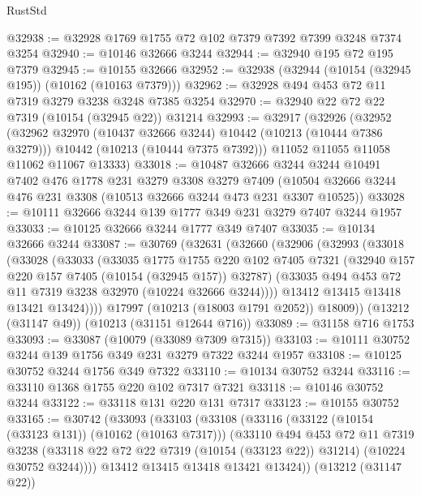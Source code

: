 \begin{lexlean}{RustStd}
\begin{coremodule}
{\begin{coremodule}
{{{{{{{{{{{{{{{{{{{{{{{{{{@32938 := @32928 @1769 @1755 @72 @102 @7379 @7392 @7399 @3248 @7374 @3254
@32940 := @10146 @32666 @3244
@32944 := @32940 @195 @72 @195 @7379
@32945 := @10155 @32666
@32952 := @32938 (@32944 (@10154 (@32945 @195)) (@10162 (@10163 @7379)))
@32962 := @32928 @494 @453 @72 @11 @7319 @3279 @3238 @3248 @7385 @3254
@32970 := @32940 @22 @72 @22 @7319 (@10154 (@32945 @22)) @31214
@32993 := @32917
    (@32926
      (@32952
        (@32962 @32970 (@10437 @32666 @3244) @10442 (@10213 (@10444 @7386 @3279)))
        @10442
        (@10213 (@10444 @7375 @7392)))
      @11052
      @11055
      @11058
      @11062
      @11067
      @13333)
@33018 := @10487
    @32666
    @3244
    @3244
    @10491
    @7402
    @476
    @1778
    @231
    @3279
    @3308
    @3279
    @7409
    (@10504 @32666 @3244 @476 @231 @3308 (@10513 @32666 @3244 @473 @231 @3307 @10525))
@33028 := @10111 @32666 @3244 @139 @1777 @349 @231 @3279 @7407 @3244 @1957
@33033 := @10125 @32666 @3244 @1777 @349 @7407
@33035 := @10134 @32666 @3244
@33087 := @30769
    (@32631
      (@32660
        (@32906
          (@32993
            (@33018
              (@33028
                (@33033
                  (@33035
                    @1775
                    @1755
                    @220
                    @102
                    @7405
                    @7321
                    (@32940 @157 @220 @157 @7405 (@10154 (@32945 @157)) @32787)
                    (@33035 @494 @453 @72 @11 @7319 @3238 @32970 (@10224 @32666 @3244))))
                @13412
                @13415
                @13418
                @13421
                @13424))))
        @17997
        (@10213 (@18003 @1791 @2052))
        @18009))
    (@13212 (@31147 @49))
    (@10213 (@31151 @12644 @716))
@33089 := @31158 @716 @1753
@33093 := @33087 (@10079 (@33089 @7309 @7315))
@33103 := @10111 @30752 @3244 @139 @1756 @349 @231 @3279 @7322 @3244 @1957
@33108 := @10125 @30752 @3244 @1756 @349 @7322
@33110 := @10134 @30752 @3244
@33116 := @33110 @1368 @1755 @220 @102 @7317 @7321
@33118 := @10146 @30752 @3244
@33122 := @33118 @131 @220 @131 @7317
@33123 := @10155 @30752
@33165 := @30742
    (@33093
      (@33103
        (@33108
          (@33116
            (@33122 (@10154 (@33123 @131)) (@10162 (@10163 @7317)))
            (@33110
              @494
              @453
              @72
              @11
              @7319
              @3238
              (@33118 @22 @72 @22 @7319 (@10154 (@33123 @22)) @31214)
              (@10224 @30752 @3244))))
        @13412
        @13415
        @13418
        @13421
        @13424))
    (@13212 (@31147 @22))
}}}}}}}}}}}}}}}}}}}}}}}}}}
\end{coremodule}}
\end{coremodule}
\end{lexlean}
